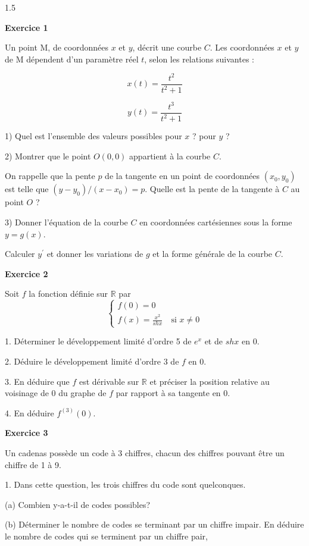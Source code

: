 \documentclass[12pt]{article}
\begin{document}
\begin{spacing}{1.5}

 
 \medskip\textbf{Exercice 1}

Un point M, de coordonnées $x$ et $y$, décrit une courbe $C$. Les coordonnées $x$ et $y$ de M 
dépendent d'un paramètre réel $t$, selon les relations suivantes : 


\[x(t) =\frac{t^2}{t^2+1}\]

\[y(t) =\frac{t^3}{t^2+1}
\]

1) Quel est l'ensemble des valeurs possibles pour $x$ ? pour $y$ ? 

2) Montrer que le point $O(0,0)$ appartient à la courbe $C$.  

On rappelle que la pente $p$ de la tangente en un point de coordonnées $(x_0,y_0)$ est telle que 
$(y - y_0)/(x - x_0) = p$. Quelle est la pente de la tangente à $C$ au point $O$ ? 

3) Donner l'équation de la courbe $C$ en coordonnées cartésiennes sous la forme $y = g(x)$. 

Calculer $y^\prime$ et donner les variations de $g$ et la forme générale de la courbe $C$.

\medskip\textbf{Exercice 2}

 Soit $f$ la fonction définie sur $\mathbb{R}$ par
 \[
 \begin{cases}
 f(0)=0\\
 f(x)= \frac{x^2}{sh x} \quad \text{si } x\neq 0
 \end{cases}
 \]
 
 1. Déterminer le développement limité d'ordre 5 de $e^x$ et de $sh x$ en 0.
 
 2. Déduire le développement limité d'ordre 3 de $f$ en 0.
 
 3. En déduire que $f$ est dérivable sur $\mathbb{R}$ et préciser la position relative au voisinage de 0 du graphe de $f$ par rapport à sa tangente en 0.
 
 4. En déduire $f^{(3)}(0)$.
 
 \medskip\textbf{Exercice 3}

 Un cadenas possède un code à 3 chiffres, chacun des chiffres pouvant être un chiffre de 1 à 9.
 
 1. Dans cette question, les trois chiffres du code sont quelconques.
 
 (a) Combien y-a-t-il de codes possibles?
 
 (b) Déterminer le nombre de codes se terminant par un chiffre impair. En déduire le nombre de codes qui se terminent par un chiffre pair,
 

\end{spacing}
\end{document}
